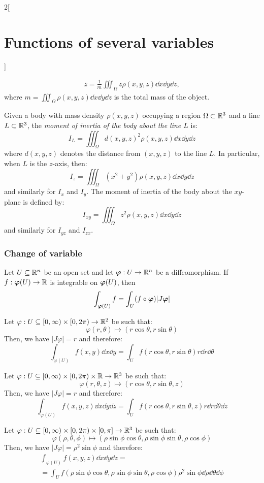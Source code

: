 \documentclass[../../../main.tex]{subfiles}
\begin{document}
\begin{multicols}{2}[\section{Functions of several variables}]
\begin{definition}
\begin{gather*}
      \overline{z}=\frac{1}{m}\iiint_\Omega z\rho(x,y,z)\dd x\dd y\dd z,
    \end{gather*}
    where $\displaystyle m=\iiint_\Omega\rho(x,y,z)\dd x\dd y\dd z$ is the total mass of the object.
  \end{definition}
  \begin{definition}
    Given a body with mass density $\rho(x,y,z)$ occupying a region $\Omega\subset\mathbb{R}^3$ and a line $L\subset\mathbb{R}^3$, the \textit{moment of inertia of the body about the line $L$} is: $$I_L=\iiint_\Omega d(x,y,z)^2\rho(x,y,z)\dd x\dd y\dd z$$ where $d(x,y,z)$ denotes the distance from $(x,y,z)$ to the line $L$. In particular, when $L$ is the $z$-axis, then: $$I_z=\iiint_\Omega (x^2+y^2)\rho(x,y,z)\dd x\dd y\dd z$$ and similarly for $I_x$ and $I_y$. The moment of inertia of the body about the $xy$-plane is defined by: $$I_{xy}=\iiint_\Omega z^2\rho(x,y,z)\dd x\dd y\dd z$$ and similarly for $I_{yz}$ and $I_{zx}.$
  \end{definition}
  \subsubsection{Change of variable}
  \begin{theorem}
    Let $U\subseteq\mathbb{R}^n$ be an open set and let $\boldsymbol{\mathrm{\varphi}}:U\rightarrow\mathbb{R}^n$ be a diffeomorphism. If $f:\boldsymbol{\mathrm{\varphi}}(U)\rightarrow\mathbb{R} $ is integrable on $\boldsymbol{\mathrm{\varphi}}(U)$, then $$\int_{\boldsymbol{\mathrm{\varphi}}(U)} f=\int_U(f\circ\boldsymbol{\mathrm{\varphi}})|J\boldsymbol{\mathrm{\varphi}}|$$
  \end{theorem}
  \begin{corollary}
    Let $\varphi:U\subseteq[0,\infty)\times[0,2\pi)\rightarrow\mathbb{R}^2 $ be such that:
    $$\varphi(r,\theta)\longmapsto(r\cos\theta,r\sin\theta)$$
    Then, we have $|J\varphi|=r$ and therefore: $$\int_{\varphi(U)}f(x,y)\dd x\dd y=\int_Uf(r\cos\theta,r\sin\theta)r\dd r \dd\theta$$
  \end{corollary}
  \begin{corollary}
    Let $\varphi:U\subseteq[0,\infty)\times[0,2\pi)\times\mathbb{R} \rightarrow\mathbb{R}^3 $ be such that: $$\varphi(r,\theta,z)\longmapsto(r\cos\theta,r\sin\theta,z)$$
    Then, we have $|J\varphi|=r$ and therefore: $$\int_{\varphi(U)}f(x,y,z)\dd x\dd y\dd z=\int_Uf(r\cos\theta,r\sin\theta,z)r\dd r \dd\theta \dd z$$
  \end{corollary}
  \begin{corollary}
    Let $\varphi:U\subseteq[0,\infty)\times[0,2\pi)\times[0,\pi]\rightarrow\mathbb{R}^3 $ be such that: $$\varphi(\rho,\theta,\phi)\longmapsto(\rho\sin\phi\cos\theta,\rho\sin\phi\sin\theta,\rho\cos\phi)$$
    Then, we have $|J\varphi|=\rho^2\sin\phi$ and therefore:
    \begin{multline*}
      \int_{\varphi(U)}f(x,y,z)\dd x\dd y\dd z=\\=\int_Uf(\rho\sin\phi\cos\theta,\rho\sin\phi\sin\theta,\rho\cos\phi)\rho^2\sin\phi \dd \rho \dd \theta \dd \phi
    \end{multline*}
  \end{corollary}

\end{multicols}
\end{document}
